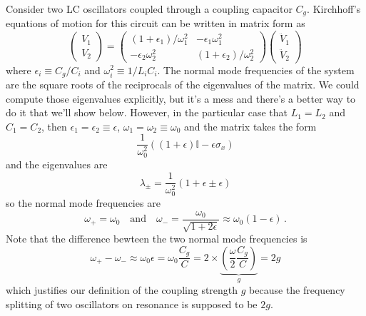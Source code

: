 
Consider two LC oscillators coupled through a coupling capacitor $C_g$.
Kirchhoff's equations of motion for this circuit can be written in matrix form
as
\begin{equation}
  \left( \begin{array}{c} V_1 \\ V_2 \end{array} \right)
  =
  \left( \begin{array}{cc}
    (1 + \epsilon_1)/\omega_1^2 & - \epsilon_1  \omega_1^2 \\
    - \epsilon_2  \omega_2^2 & (1 + \epsilon_2)/\omega_2^2
  \end{array} \right)
  \left( \begin{array}{c} \ddot{V}_1 \\ \ddot{V}_2 \end{array} \right)
\end{equation}
where $\epsilon_i \equiv C_g / C_i$ and $\omega_i^2 \equiv 1 / L_i C_i$.
The normal mode frequencies of the system are the square roots of the reciprocals of the eigenvalues of the matrix.
We could compute those eigenvalues explicitly, but it's a mess and there's a better way to do it that we'll show below.
However, in the particular case that $L_1 = L_2$ and $C_1 = C_2$, then $\epsilon_1 = \epsilon_2 \equiv \epsilon$, $\omega_1 = \omega_2 \equiv \omega_0$ and the matrix takes the form
\begin{equation}
  \frac{1}{\omega_0^2} \left( 
    (1 + \epsilon) \mathbb{I} - \epsilon \sigma_x
  \right)
\end{equation}
and the eigenvalues are
\begin{equation}
  \lambda_{\pm} = \frac{1}{\omega_0^2} ( 1 + \epsilon \pm \epsilon)
\end{equation}
so the normal mode frequencies are
\begin{equation}
  \omega_+ = \omega_0 \quad
  \text{and} \quad
  \omega_- = \frac{\omega_0}{\sqrt{1 + 2 \epsilon}}
    \approx \omega_0 (1 - \epsilon) \, .
\end{equation}
Note that the difference bewteen the two normal mode frequencies is
\begin{equation}
  \omega_+ - \omega_- \approx \omega_0 \epsilon
  = \omega_0 \frac{C_g}{C}
  = 2 \times \underbrace{\left(\frac{\omega}{2} \frac{C_g}{C} \right)}_g
  = 2 g
\end{equation}
which justifies our definition of the coupling strength $g$ because the frequency splitting of two oscillators on resonance is supposed to be $2g$.

